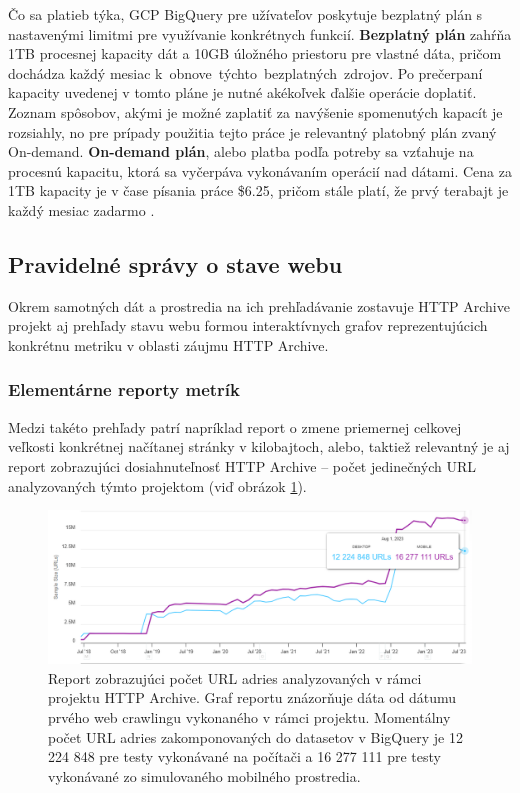 \pagebreak

Čo sa platieb týka, GCP BigQuery pre užívateľov poskytuje bezplatný plán s nastavenými limitmi pre využívanie konkrétnych funkcií.
\textbf{Bezplatný plán} zahŕňa 1TB procesnej kapacity dát a 10GB úložného priestoru pre vlastné dáta, pričom dochádza každý mesiac \mbox{k obnove týchto bezplatných zdrojov}.
Po prečerpaní kapacity uvedenej v tomto pláne je nutné akékoľvek ďalšie operácie doplatiť.
Zoznam spôsobov, akými je možné zaplatiť za navýšenie spomenutých kapacít je rozsiahly, no pre prípady použitia tejto práce je relevantný platobný plán zvaný On-demand.
\textbf{On-demand plán}, alebo platba podľa potreby sa vzťahuje na procesnú kapacitu, ktorá sa vyčerpáva vykonávaním operácií nad dátami.
Cena za 1TB kapacity je v čase písania práce \$6.25, pričom stále platí, že prvý terabajt je každý mesiac zadarmo \cite{google-bq-pricing}.

\subsection{Pravidelné správy o stave webu}

Okrem samotných dát a prostredia na ich prehľadávanie zostavuje HTTP Archive projekt aj prehľady stavu webu formou interaktívnych grafov reprezentujúcich konkrétnu metriku v oblasti záujmu HTTP Archive.

\subsubsection{Elementárne reporty metrík}
Medzi takéto prehľady patrí napríklad report o zmene priemernej celkovej veľkosti konkrétnej načítanej stránky v kilobajtoch, alebo, taktiež relevantný je aj report zobrazujúci dosiahnuteľnosť HTTP Archive -- počet jedinečných URL analyzovaných týmto projektom (viď obrázok \ref{img:total-urls-report}).

\begin{figure}[!htb]
\begin{center}
 \includegraphics[scale=0.51815]{obrazky-figures/total_urls_report.png}    
 \caption{\centering Report zobrazujúci počet URL adries analyzovaných v rámci projektu HTTP Archive. Graf reportu znázorňuje dáta od dátumu prvého web crawlingu vykonaného v rámci projektu. Momentálny počet URL adries zakomponovaných do datasetov v BigQuery je 12 224 848 pre testy vykonávané na počítači a 16 277 111 pre testy vykonávané zo simulovaného mobilného prostredia.}
 \label{img:total-urls-report}
\end{center}
\end{figure}

